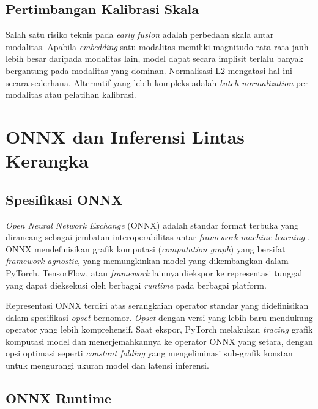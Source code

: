 \subsection{Pertimbangan Kalibrasi Skala}

Salah satu risiko teknis pada \textit{early fusion} adalah perbedaan skala antar modalitas. Apabila \textit{embedding} satu modalitas memiliki magnitudo rata-rata jauh lebih besar daripada modalitas lain, model dapat secara implisit terlalu banyak bergantung pada modalitas yang dominan. Normalisasi L2 mengatasi hal ini secara sederhana. Alternatif yang lebih kompleks adalah \textit{batch normalization} per modalitas atau pelatihan kalibrasi.

\section{ONNX dan Inferensi Lintas Kerangka}
\label{sec:onnx}

\subsection{Spesifikasi ONNX}

\textit{Open Neural Network Exchange} (ONNX) adalah standar format terbuka yang dirancang sebagai jembatan interoperabilitas antar-\textit{framework} \textit{machine learning} \citep{onnxruntime2024}. ONNX mendefinisikan grafik komputasi (\textit{computation graph}) yang bersifat \textit{framework-agnostic}, yang memungkinkan model yang dikembangkan dalam PyTorch, TensorFlow, atau \textit{framework} lainnya diekspor ke representasi tunggal yang dapat dieksekusi oleh berbagai \textit{runtime} pada berbagai platform.

Representasi ONNX terdiri atas serangkaian operator standar yang didefinisikan dalam spesifikasi \textit{opset} bernomor. \textit{Opset} dengan versi yang lebih baru mendukung operator yang lebih komprehensif. Saat ekspor, PyTorch melakukan \textit{tracing} grafik komputasi model dan menerjemahkannya ke operator ONNX yang setara, dengan opsi optimasi seperti \textit{constant folding} yang mengeliminasi sub-grafik konstan untuk mengurangi ukuran model dan latensi inferensi.

\subsection{ONNX Runtime}

